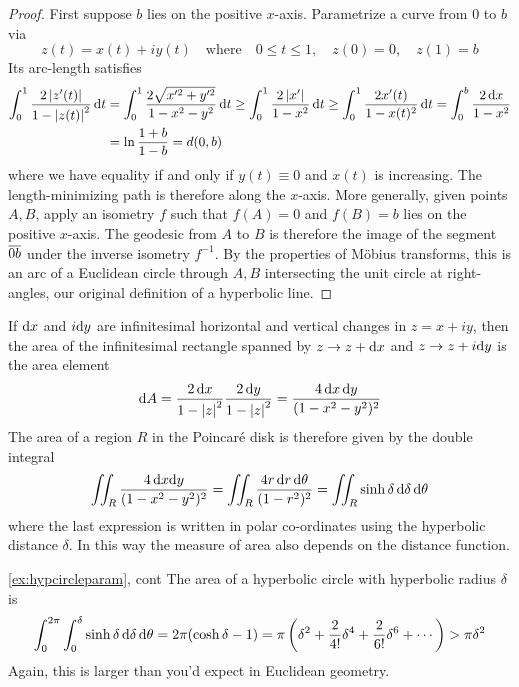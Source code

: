\begin{proof}
	First suppose $b$ lies on the positive $x$-axis. Parametrize a curve from $0$ to $b$ via
	\[
		z(t)=x(t)+iy(t)\quad\text{where}\quad 0\le t\le 1,\quad z(0)=0,\quad z(1)=b
	\]
	Its arc-length satisfies
	\begin{align*}
		\int_{0}^{1}\frac{2\left| z'(t)\right|}{1-\left| z(t)\right|^2}\,{\mathrm{d} t}
		&=\int_{0}^{1}\frac{2\sqrt{x'^2+y'^2}}{1-x^2-y^2}\,{\mathrm{d} t}\ge \int_{0}^{1}\frac{2\left| x'\right|}{1-x^2}\,{\mathrm{d} t}\ge \int_{0}^{1}\frac{2x'(t)}{1-x(t)^2}\,{\mathrm{d} t} =\int_0^b\frac{2\,{\mathrm{d} x}}{1-x^2}\\
		&=\ln\frac{1+b}{1-b}=d(0,b)
	\end{align*}
	where we have equality if and only if $y(t)\equiv 0$ and $x(t)$ is increasing. The length-minimizing path is therefore along the $x$-axis.\smallbreak
	More generally, given points $A,B$, apply an isometry $f$ such that $f(A)=0$ and $f(B)=b$ lies on the positive $x$-axis. The geodesic from $A$ to $B$ is therefore the image of the segment $\overline{0b}$ under the inverse isometry $f^{-1}$. By the properties of Möbius transforms, this is an arc of a Euclidean circle through $A,B$ intersecting the unit circle at right-angles, our original definition of a hyperbolic line.
\end{proof}


If ${\mathrm{d} x}$ and $i{\mathrm{d} y}$ are infinitesimal horizontal and vertical changes in $z=x+iy$, then the area of the infinitesimal rectangle spanned by $z\to z+{\mathrm{d} x}$ and $z\to z+i{\mathrm{d} y}$ is the area element
\[
	{\mathrm{d} A}=\frac{2\,{\mathrm{d} x}}{1-\left| z\right|^2}\frac{2\,{\mathrm{d} y}}{1-\left| z\right|^2} =\frac{4\,{\mathrm{d} x}\,{\mathrm{d} y}}{(1-x^2-y^2)^2}
\]
The area of a region $R$ in the Poincaré disk is therefore given by the double integral
\[
	\iint_R\frac{4\,{\mathrm{d} x}{\mathrm{d} y}}{(1-x^2-y^2)^2}=\iint_R\frac{4r\,{\mathrm{d} r}\,{\mathrm{d}\theta}}{(1-r^2)^2} =\iint_R\sinh\delta\,\mathrm{d}\delta\,{\mathrm{d}\theta}
\]
where the last expression is written in polar co-ordinates using the hyperbolic distance $\delta$. In this way the measure of area also depends on the distance function.
	
\begin{example*}{\ref{ex:hypcircleparam}, cont}
	The area of a hyperbolic circle with hyperbolic radius $\delta$ is
	\[
		\int_0^{2\pi}\int_0^\delta\sinh\delta\,\mathrm{d}\delta\,{\mathrm{d}\theta} =2\pi(\cosh\delta-1) =\pi\left(\delta^2+\frac{2}{4!}\delta^4+\frac{2}{6!}\delta^6+\cdots\right)>\pi\delta^2
	\]
	Again, this is larger than you'd expect in Euclidean geometry.
\end{example*}


